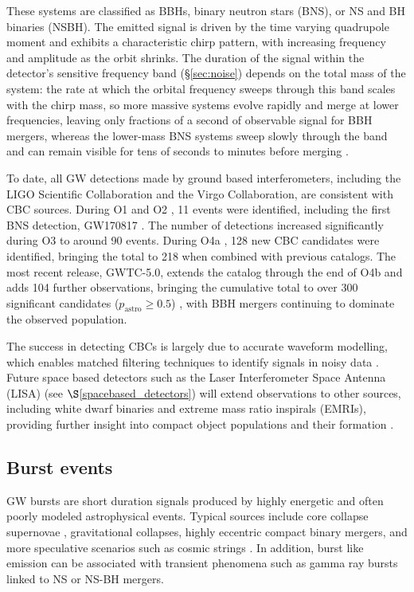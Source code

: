 These systems are classified as BBHs, binary neutron stars (BNS), or NS and BH binaries (NSBH). The emitted signal is driven by the time varying quadrupole moment and exhibits a characteristic chirp pattern, with increasing frequency and amplitude as the orbit shrinks. The duration of the signal within the detector's sensitive frequency band (\S\ref{sec:noise}) depends on the total mass of the system: the rate at which the orbital frequency sweeps through this band scales with the chirp mass, so more massive systems evolve rapidly and merge at lower frequencies, leaving only fractions of a second of observable signal for BBH mergers, whereas the lower-mass BNS systems sweep slowly through the band and can remain visible for tens of seconds to minutes before merging \cite{maggiore2007gravitational}.

To date, all GW detections made by ground based interferometers, including the LIGO Scientific Collaboration and the Virgo Collaboration, are consistent with CBC sources. During O1 and O2 \cite{O1_O2_catalog}, 11 events were identified, including the first BNS detection, GW170817 \cite{GW170817}. The number of detections increased significantly during O3 \cite{O3_catalog, O3_catalogue_part2} to around 90 events. During O4a \cite{O4a_catalog}, 128 new CBC candidates were identified, bringing the total to 218 when combined with previous catalogs. The most recent release, GWTC-5.0, extends the catalog through the end of O4b and adds 104 further observations, bringing the cumulative total to over 300 significant candidates ($p_\mathrm{astro}\geq0.5$) \cite{GWTC5}, with BBH mergers continuing to dominate the observed population.

The success in detecting CBCs is largely due to accurate waveform modelling, which enables matched filtering techniques to identify signals in noisy data \cite{GWTC5_methods}. Future space based detectors such as the Laser Interferometer Space Antenna (LISA) (see $\S$\ref{spacebased_detectors}) will extend observations to other sources, including white dwarf binaries and extreme mass ratio inspirals (EMRIs), providing further insight into compact object populations and their formation \cite{EMRIs-WD}.


\subsection{Burst events}  
GW bursts are short duration signals produced by highly energetic and often poorly modeled astrophysical events. Typical sources include core collapse supernovae \cite{core_collapse_supernovae}, gravitational collapses, highly eccentric compact binary mergers, and more speculative scenarios such as cosmic strings \cite{burst_events}. In addition, burst like emission can be associated with transient phenomena such as gamma ray bursts linked to NS or NS-BH mergers.

